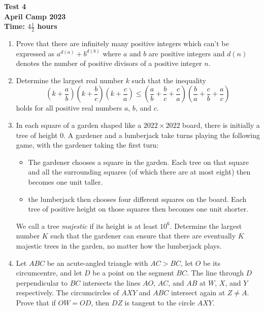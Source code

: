 \documentclass{article}
\newcommand{\parens}[1]{\left(#1\right)}
\begin{document}
\thispagestyle{empty}

\begin{center}
  \textbf{\Large Test 4}
  \\ \vspace{1em}
  \textbf{\large April Camp 2023}
  \\ \vspace{1em}
  \textbf{\large Time: $4\frac{1}{2}$ hours}
\end{center}

\vfill

\begin{enumerate}[itemsep=\fill]

\item %
Prove that there are infinitely many positive integers which can't be expressed as $a^{d(a)}+b^{d(b)}$ where $a$ and $b$ are positive integers and $d(n)$ denotes the number of positive divisors of a positive integer $n$.


\item %
Determine the largest real number $k$ such that the inequality
\[ \parens{k+\frac{a}{b}} \parens{k+\frac{b}{c}} \parens{k+\frac{c}{a}} \leq \parens{\frac{a}{b}+\frac{b}{c}+\frac{c}{a}} \parens{\frac{b}{a}+\frac{c}{b}+\frac{a}{c}} \]
holds for all positive real numbers $a$, $b$, and $c$.


\item %
In each square of a garden shaped like a $2022 \times 2022$ board, there is initially a tree of height $0$.
A gardener and a lumberjack take turns playing the following game, with the gardener taking the first turn:
\begin{itemize}
  \item The gardener chooses a square in the garden. Each tree on that square and all the surrounding squares (of which there are at most eight) then becomes one unit taller.
  \item the lumberjack then chooses four different squares on the board. Each tree of positive height on those squares then becomes one unit shorter.
\end{itemize}
We call a tree \emph{majestic} if its height is at least $10^6$.
Determine the largest number $K$ such that the gardener can ensure that there are eventually $K$ majestic trees in the garden, no matter how the lumberjack plays.


\item %
Let $ABC$ be an acute-angled triangle with $AC > BC$, let $O$ be its circumcentre, and let $D$ be a point on the segment $BC$.
The line through $D$ perpendicular to $BC$ intersects the lines $AO$, $AC$, and $AB$ at $W$, $X$, and $Y$ respectively.
The circumcircles of $AXY$ and $ABC$ intersect again at $Z \neq A$.
Prove that if $OW = OD$, then $DZ$ is tangent to the circle $AXY$.


\end{enumerate}
\end{document}
